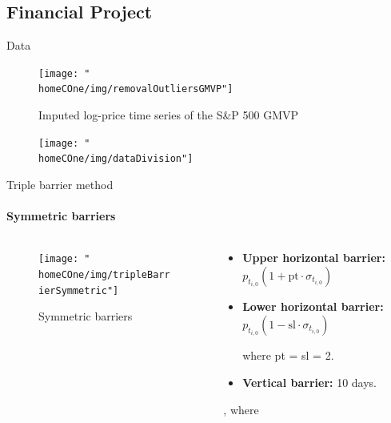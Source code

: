 \documentclass{beamer} %
\newcommand{\homeCOne}{../../Chapter 1 - Metalabeling/Draft}
\begin{document}
\subsection{Financial Project}
\begin{frame}{Data}
\begin{figure}[htbp]
	\centering
	\texttt{[image: "\\homeCOne/img/removalOutliersGMVP"]}
	\caption{Imputed log-price time series of the S\&P 500 GMVP}
	\label{fig:removalOutlierGMVP}
\end{figure}

\vspace{-.4cm}

\begin{figure}[htbp]
	\centering
	\texttt{[image: "\\homeCOne/img/dataDivision"]}
\end{figure}

\end{frame}

\begin{frame}{Triple barrier method}
\framesubtitle{Symmetric barriers}
\begin{columns}
\begin{column}{.6\textwidth}
\begin{figure}
	\centering
	\texttt{[image: "\\homeCOne/img/tripleBarrierSymmetric"]}
	\caption{Symmetric barriers}
\end{figure}
\end{column}
\begin{column}{.4\textwidth}
	\begin{itemize}
		\item \textbf{Upper horizontal barrier:} $p_{t_{i,0}} (1 + \text{pt} 
		\cdot \sigma_{t_{i,0}})$
		
		\item \textbf{Lower horizontal barrier:} $p_{t_{i,0}} (1 - \text{sl} 
		\cdot \sigma_{t_{i,0}})$	
	
	\vspace{.2cm}
	\hspace{-.5cm} where pt = sl = 2.
	\vspace{.2cm}
		
		\item \textbf{Vertical barrier:} 10 days.
	\end{itemize}

	\begin{center}
	, where
	\end{center}
\end{column}
\end{columns}

\end{frame}
\end{document}
